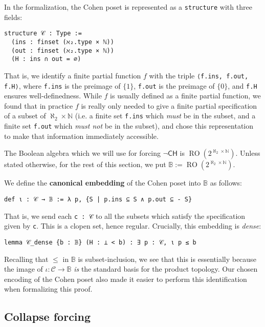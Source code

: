 \documentclass[sigplan,10pt,review, anonymous]{acmart}
\newcommand{\B}{\mathbb{B}}
\newcommand{\lil}{\lstinline}
\theoremstyle{definition}
\newcommand{\lil}{\lstinline}
\newcommand{\B}{\mathbb{B}}
\begin{document}
In the formalization, the Cohen poset is represented as a \lstinline{structure} with three fields:
\begin{lstlisting}[breaklines, basicstyle=\ttfamily\small]
structure 𝒞 : Type :=
  (ins : finset (ℵ₂.type × ℕ))
  (out : finset (ℵ₂.type × ℕ))
  (H : ins ∩ out = ∅)
\end{lstlisting}

That is, we identify a finite partial function $f$ with the triple \lil{⟨f.ins, f.out, f.H⟩}, where \lil{f.ins} is the preimage of $\{1\}$, \lil{f.out} is the preimage of $\{0\}$, and \lil{f.H} ensures well-definedness. While $f$ is usually defined as a finite partial function, we found that in practice $f$ is really only needed to give a finite partial specification of a subset of $\aleph_2 \times \mathbb{N}$ (i.e. a finite set \lil{f.ins} which \emph{must} be in the subset, and a finite set \lil{f.out} which \emph{must not} be in the subset), and chose this representation to make that information immediately accessible.

The Boolean algebra which we will use for forcing $\neg\mathsf{CH}$ is $\operatorname{RO}(2^{\aleph_2 \times \mathbb{N}})$. Unless stated otherwise, for the rest of this section, we put $\B := \operatorname{RO}(2^{\aleph_2 \times \mathbb{N}})$.

\begin{definition}
  We define the \textbf{canonical embedding} of the Cohen poset into $\B$ as follows:
  \begin{lstlisting}
def ι : 𝒞 → 𝔹 := λ p, {S | p.ins ⊆ S ∧ p.out ⊆ - S}
\end{lstlisting}
\end{definition}
That is, we send each \lil{c : 𝒞} to all the subsets which satisfy the specification given by \lil{c}. This is a clopen set, hence regular. Crucially, this embedding is \emph{dense}:
\begin{lstlisting}
lemma 𝒞_dense {b : 𝔹} (H : ⊥ < b) : ∃ p : 𝒞, ι p ≤ b
\end{lstlisting}
Recalling that $\leq$ in $\B$ is subset-inclusion, we see that this is essentially because the image of $\iota : \mathcal{C} \to \B$ \emph{is} the standard basis for the product topology. Our chosen encoding of the Cohen poset also made it easier to perform this identification when formalizing this proof.

\subsection{Collapse forcing} \label{subsection:collapse}
\end{document}
